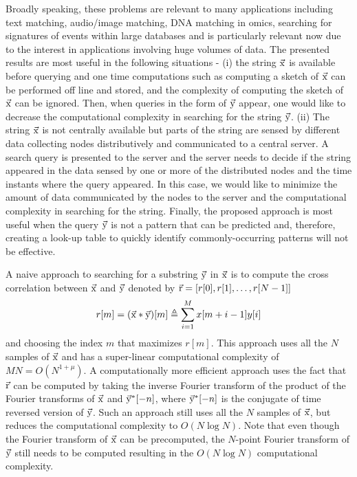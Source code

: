 Broadly speaking, these problems are relevant to many applications including text matching, audio/image matching, DNA matching in omics, searching for signatures of events within large databases and is particularly relevant now due to the interest in applications involving huge volumes of data. The presented results are most useful in the following situations - (i) the string $\vec{\mathrm{x}}$ is available before querying and one time computations such as computing a sketch of $\vec{\mathrm{x}}$ can be performed off line and stored, and the complexity of computing the sketch of $\vec{\mathrm{x}}$ can be ignored. Then, when queries in the form of $\vec{\mathrm{y}}$ appear, one would like to decrease the computational complexity in searching for the string $\vec{\mathrm{y}}$. (ii) The string $\vec{\mathrm{x}}$ is not centrally available but parts of the string are sensed by different data collecting nodes distributively and communicated to a central server. A search query is presented to the server and the server needs to decide if the string appeared in the data sensed by one or more of the distributed nodes and the time instants where the query appeared. In this case, we would like to minimize the amount of data communicated by the nodes to the server and the computational complexity in searching for the string. Finally, the proposed approach is most useful when the query $\vec{\mathrm{y}}$ is not a pattern that can be predicted and, therefore, creating a look-up table to quickly identify commonly-occurring patterns will not be effective.

A naive approach to searching for a substring $\vec{\mathrm{y}}$ in $\vec{\mathrm{x}}$ is to compute the cross correlation between $\vec{\mathrm{x}}$ and $\vec{\mathrm{y}}$ denoted by  $\vec{\mathrm{r}}=[r[0], r[1],\ldots, r[N-1]]$
\begin{align}
\label{Eqn:DefCrossCorrelation}
r[m]=(\vec{\mathrm{x}}*\vec{\mathrm{y}})[m] \triangleq \sum_{i=1}^{M} x[m+i-1] y[i]
\end{align}
and choosing the index $m$ that maximizes $r[m]$. This approach uses all the $N$ samples of $\vec{\mathrm{x}}$ and has a super-linear computational complexity of $MN = O(N^{1+\mu})$. A computationally more efficient approach uses the fact that $\vec{\mathrm{r}}$ can be computed by taking the inverse Fourier transform of the product of the Fourier transforms of $\vec{\mathrm{x}}$ and $ \vec{\mathrm{y}}^*[-n]$, where $\vec{\mathrm{y}}^*[-n]$ is the conjugate of time reversed version of $\vec{\mathrm{y}}$. Such an approach still uses all the $N$ samples of $\vec{\mathrm{x}}$, but reduces the computational complexity to $O(N \log N)$. Note that even though the Fourier transform of $\vec{\mathrm{x}}$ can be precomputed, the $N$-point Fourier transform of $\vec{\mathrm{y}}$ still needs to be computed resulting in the $O(N \log N)$ computational complexity.

